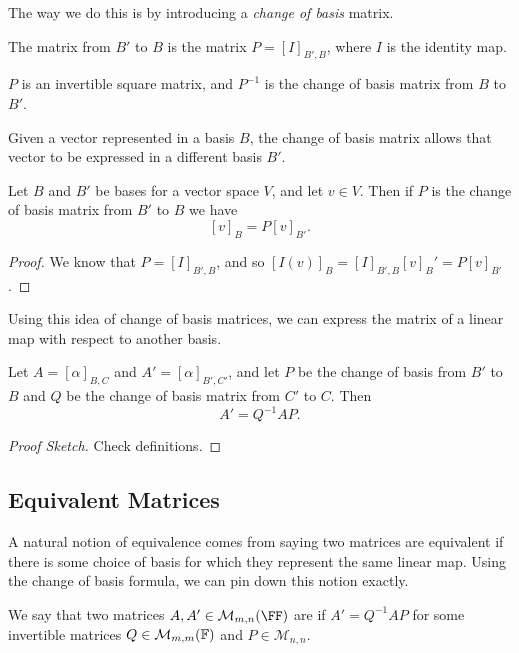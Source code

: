 \documentclass[a4paper]{scrartcl}
\begin{document}
The way we do this is by introducing a \emph{change of basis} matrix.

\begin{definition}    
    The  matrix from $B'$ to $B$ is the matrix
    $P = [I]_{B', B}$, where $I$ is the identity map.
\end{definition}
\begin{remark}
    $P$ is an invertible square matrix, and $P^{-1}$ is the change of basis matrix from $B$ to $B'$. 
\end{remark}

Given a vector represented in a basis $B$, the change of basis matrix allows that vector to be expressed in a different basis $B'$.

\begin{lemma}
    Let $B$ and $B'$ be bases for a vector space $V$, and let $v \in V$. Then if $P$ is the change of basis matrix from $B'$ to $B$ we have
    $$
    [v]_{B} = P[v]_{B'}.
    $$
\end{lemma}
\begin{proof}
    We know that $P = [I]_{B', B}$, and so $[I(v)]_B = [I]_{B', B} [v]_B' = P[v]_{B'}$.
\end{proof}

Using this idea of change of basis matrices, we can express the matrix of a linear map with respect to another basis.

\begin{proposition}
    Let $A = [\alpha]_{B, C}$ and $A' = [\alpha]_{B', C'}$, and let $P$ be the change of basis from $B'$ to $B$ and $Q$ be the change of basis matrix from $C'$ to $C$. Then
    $$
    A' = Q^{-1} AP.
    $$
\end{proposition}
\begin{proof}[Proof Sketch]
    Check definitions.
\end{proof}

\subsection{Equivalent Matrices}

A natural notion of equivalence comes from saying 
two matrices are equivalent if there is some choice of basis for which they represent the same linear map. Using the change of basis formula, we can pin down this notion exactly.

\begin{definition}
    We say that two matrices $A, A' \in \mathcal{M}_{m, n}(\FF)$ are  if $A' = Q^{-1}AP$ for some invertible matrices $Q \in \mathcal{M}_{m, m}(\mathbb{F})$ and $P \in \mathcal{M}_{n, n}$.    
\end{definition}
\end{document}
